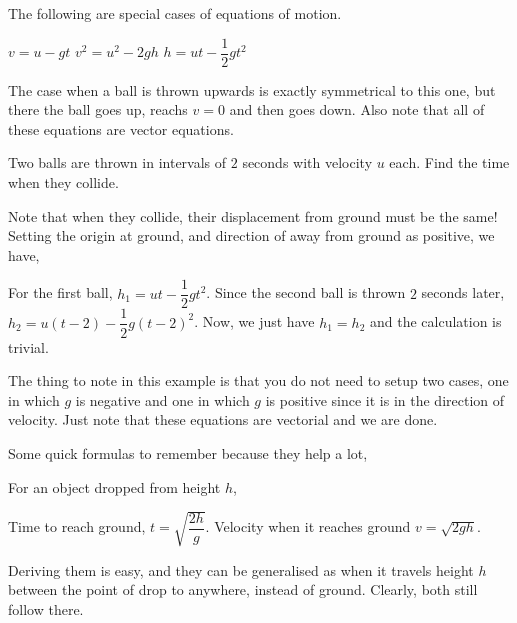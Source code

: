 \begin{algorithm}
    The following are special cases of equations of motion.
    \begin{enumerate}
        \ii \(v = u - gt\)
        \ii \(v^2 = u^2 -2gh\)
        \ii \(h = ut - \dfrac{1}{2}gt^2\)
    \end{enumerate} 
\end{algorithm}

The case when a ball is thrown upwards is exactly symmetrical to this one, but there
the ball goes up, reachs \(v = 0\) and then goes down. Also note that all of these equations are vector
equations.

\begin{example}
    Two balls are thrown in intervals of \(2\) seconds with velocity \(u\) each. Find the
    time when they collide.

    \begin{soln}
        Note that when they collide, their displacement from ground must be the same! Setting 
        the origin at ground, and direction of away from ground as positive, we have,
        
        For the first ball, \(h_{1} = ut - \dfrac{1}{2}gt^2\). Since the second ball
        is thrown \(2\) seconds later, \(h_{2} = u(t-2) - \dfrac{1}{2}g(t-2)^2\). Now, we just have
        \(h_{1} = h_{2}\) and the calculation is trivial.
    \end{soln}
\end{example}

The thing to note in this example is that you do not need to setup two cases, one in which
\(g\) is negative and one in which \(g\) is positive since it is in the direction of velocity. 
Just note that these equations are vectorial and we are done.

Some quick formulas to remember because they help a lot,

\begin{algorithm}
    For an object dropped from height \(h\),
    \begin{enumerate}
        \ii Time to reach ground, \(t = \sqrt{\dfrac{2h}{g}}\).
        \ii Velocity when it reaches ground \(v = \sqrt{2gh}\).
    \end{enumerate}
\end{algorithm}

Deriving them is easy, and they can be generalised as when it travels height \(h\) between
the point of drop to anywhere, instead of ground. Clearly, both still follow there.

